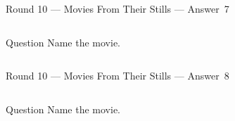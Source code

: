 \documentclass[11pt]{beamer}
\begin{document}
\begin{frame}[t]{Round 10 --- Movies From Their Stills --- \mbox{Answer 7}}
    \vspace{-0.5em}
    \begin{columns}[T,totalwidth=\linewidth]
        \begin{column}{0.32\linewidth}
            \begin{block}{Question}
                Name the movie.
            \end{block}
        \end{column}
        \begin{column}{0.65\linewidth}
            \begin{center}
                \texttt{[image: \{Images/zoolander]}.jpg}
            \end{center}
        \end{column}
    \end{columns}
\end{frame}
\begin{frame}[t]{Round 10 --- Movies From Their Stills --- \mbox{Answer 8}}
    \vspace{-0.5em}
    \begin{columns}[T,totalwidth=\linewidth]
        \begin{column}{0.32\linewidth}
            \begin{block}{Question}
                Name the movie.
            \end{block}
        \end{column}
        \begin{column}{0.65\linewidth}
            \begin{center}
                \texttt{[image: \{Images/die-hard]}.jpg}
            \end{center}
        \end{column}
    \end{columns}
\end{frame}
\end{document}
